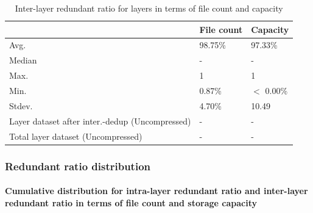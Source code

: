 \begin{table} 
	\centering 
	\scriptsize  
	\caption{Inter-layer redundant ratio for layers in terms of file count and capacity} \label{tbl:inter_dup_ratio_layers} 
	\begin{tabular}{|l|l|l|}%
		\hline 
		& File count & Capacity \\
		\hline
		Avg. & 98.75\% & 97.33\%\\
		\hline
		Median & - & - \\
		\hline
		Max. & 1 & 1\\
		\hline
		Min.  & 0.87\%  & $<$ 0.00\%\\
		\hline
		Stdev.  &  4.70\% & 10.49\\
		\hline
		Layer dataset after inter.-dedup (Uncompressed) & -  & -\\
		\hline 
		Total layer dataset (Uncompressed) &  -	& -\\
		\hline
	\end{tabular} 
\end{table}

\subsubsection{Redundant ratio distribution}

\paragraph{Cumulative distribution for intra-layer redundant ratio and inter-layer redundant ratio in terms of file count and storage capacity}

